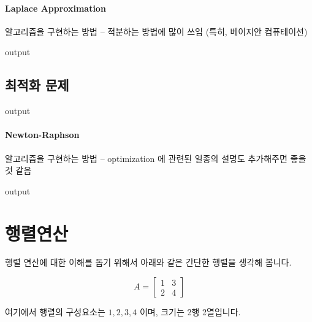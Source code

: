 \documentclass{report}
\begin{document}
\paragraph{Laplace Approximation} 알고리즘을 구현하는 방법 -- 적분하는 방법에 많이 쓰임 (특히, 베이지안 컴퓨테이션) 
\begin{Schunk}
\begin{Soutput}
output
\end{Soutput}
\end{Schunk}

\subsection{최적화 문제}
\begin{Schunk}
\begin{Soutput}
output
\end{Soutput}
\end{Schunk}
\paragraph{Newton-Raphson} 알고리즘을 구현하는 방법 -- optimization 에 관련된 일종의 설명도 추가해주면 좋을 것 같음 
\begin{Schunk}
\begin{Soutput}
output
\end{Soutput}
\end{Schunk}


\section{행렬연산}

행렬 연산에 대한 이해를 돕기 위해서 아래와 같은 간단한 행렬을 생각해 봅니다. 

\begin{equation}
A = 
\begin{bmatrix}
1 & 3 \\
2 & 4 
\end{bmatrix}
\end{equation}

여기에서 행렬의 구성요소는 $1,2,3,4$ 이며, 크기는 2행 2열입니다. 

\end{document}
